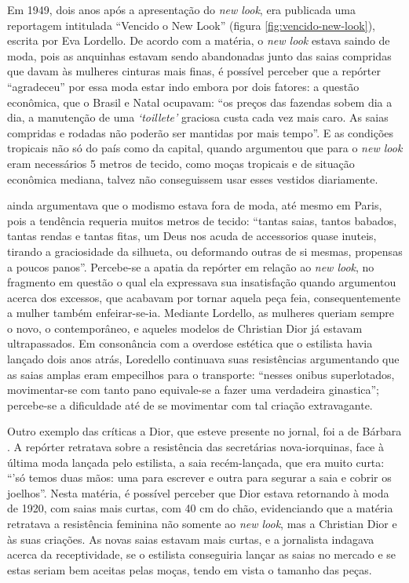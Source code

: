 \begin{refsection}
    Em 1949, dois anos após a apresentação do \textit{new look}, era publicada uma reportagem intitulada ``Vencido o New Look'' (figura \ref{fig:vencido-new-look}), escrita por Eva Lordello. De acordo com a matéria, o \textit{new look} estava saindo de moda, pois as anquinhas estavam sendo abandonadas junto das saias compridas que davam às mulheres cinturas mais finas, é possível perceber que a repórter ``agradeceu'' por essa moda estar indo embora por dois fatores: a questão econômica, que o Brasil e Natal ocupavam: ``os preços das fazendas sobem dia a dia, a manutenção de uma \textit{`toillete'} graciosa custa cada vez mais caro. As saias compridas e rodadas não poderão ser mantidas por mais tempo''. E as condições tropicais não só do país como da capital, quando argumentou que para o \textit{new look} eram necessários 5 metros de tecido, como moças tropicais e de situação econômica mediana, talvez não conseguissem usar esses vestidos diariamente.

    \textcite{Lordello1949Vencido} ainda argumentava que o modismo estava fora de moda, até mesmo em Paris, pois a tendência requeria muitos metros de tecido: ``tantas saias, tantos babados, tantas rendas e tantas fitas, um Deus nos acuda de accessorios quase inuteis, tirando a graciosidade da silhueta, ou deformando outras de si mesmas, propensas a poucos panos''. Percebe-se a apatia da repórter em relação ao \textit{new look}, no fragmento em questão o qual ela expressava sua insatisfação quando argumentou acerca dos excessos, que acabavam por tornar aquela peça feia, consequentemente a mulher também enfeirar-se-ia. Mediante Lordello, as mulheres queriam sempre o novo, o contemporâneo, e aqueles modelos de Christian Dior já estavam ultrapassados. Em consonância com a overdose estética que o estilista havia lançado dois anos atrás, Loredello continuava suas resistências argumentando que as saias amplas eram empecilhos para o transporte: ``nesses onibus superlotados, movimentar-se com tanto pano equivale-se a fazer uma verdadeira ginastica''; percebe-se a dificuldade até de se movimentar com tal criação extravagante.

    Outro exemplo das críticas a Dior, que esteve presente no jornal, foi a de Bárbara \textcite{Miller1953Luta}. A repórter retratava sobre a resistência das secretárias nova-iorquinas, face à última moda lançada pelo estilista, a saia recém-lançada, que era muito curta: ``'só temos duas mãos: uma para escrever e outra para segurar a saia e cobrir os joelhos''. Nesta matéria, é possível perceber que Dior estava retornando à moda de 1920, com saias mais curtas, com 40 cm do chão, evidenciando que a matéria retratava a resistência feminina não somente ao \textit{new look}, mas a Christian Dior e às suas criações. As novas saias estavam mais curtas, e a jornalista indagava acerca da receptividade, se o estilista conseguiria lançar as saias no mercado e se estas seriam bem aceitas pelas moças, tendo em vista o tamanho das peças.  


\end{refsection}
